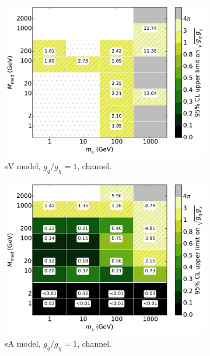 \begin{figure}
\begin{subfigure}[t]{0.32\textwidth}
    \centering
    \includegraphics[width=1.\textwidth]{figures/grid_basepoints_SVD_rat1_monoWZ.pdf}
    \caption{sV model, $g_q/g_{\chi} = 1$, \monoWZ channel.}
    \vspace{0.75cm}
  \end{subfigure}
  \begin{subfigure}[t]{0.32\textwidth}
    \centering
    \includegraphics[width=1.\textwidth]{figures/grid_basepoints_SAD_rat1_monojet.pdf}
    \caption{sA model, $g_q/g_{\chi} = 1$, \monojet channel.}
  \end{subfigure}
  \begin{subfigure}[t]{0.32\textwidth}
    \centering

\end{subfigure}
\end{figure}
